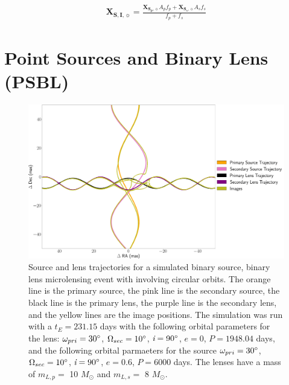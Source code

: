 \documentclass[twocolumn]{aastex701}
\newcommand{\vect}[1]{\boldsymbol{#1}}
\newcommand{\Xspvec}{\vect{X}_{\boldsymbol{S_p},\sun}}
\newcommand{\XIvec}{\vect{X}_{\boldsymbol{S, I},\sun}}
\newcommand{\Xssvec}{\vect{X}_{\boldsymbol{S_s},\sun}}
\newcommand{\w}{\omega_{pri}}
\newcommand{\bigomega}{\Omega_{sec}}
\newcommand{\inclination}{\textit{i}}
\newcommand{\period}{\textit{P}}
\begin{document}
\begin{eqnarray}
    \XIvec = \frac{\Xspvec A_p f_p + \Xssvec A_s f_s}{f_p+f_s}
\end{eqnarray}


\section{Point Sources and Binary Lens (PSBL) 
\label{sec:binlenses}}

\begin{figure}
    \centering
    \includegraphics[width= \textwidth] {figures/bsbl_keplerian.png}
    \caption{Source and lens trajectories for a simulated binary source, binary lens microlensing event with  involving circular orbits. The orange line is the primary source, the pink line is the secondary source, the black line is the primary lens, the purple line is the secondary lens, and the yellow lines are the image positions. The simulation was run with a $t_E = 231.15$ days with the following orbital parameters for the lens: $\w = 30 \degree$, $\bigomega = 10 \degree$, $\inclination = 90 \degree$, $e=0$, $\period = 1948.04 $ days, and the following orbital parmaeters for the source $\w = 30 \degree$, $\bigomega = 10 \degree$, $\inclination = 90 \degree$, $e=0.6$, $\period = 6000 $ days. The lenses have a mass of $m_{L,p}=$ 10 $M_\odot$ and $m_{L,s}=$ 8 $M_\odot$.}
    \label{fig:bsbl_keplerian}
\end{figure}
\end{document}
